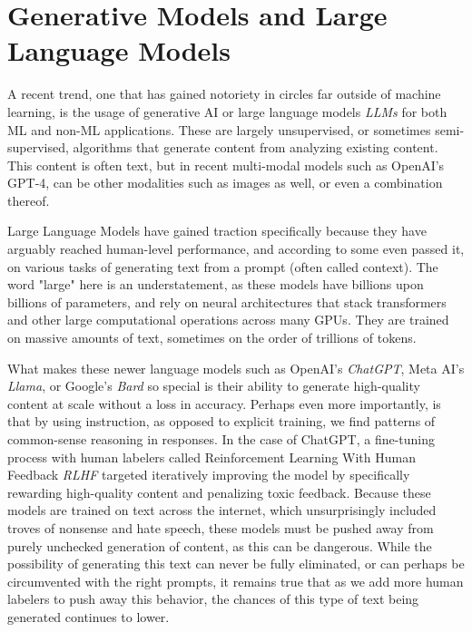 
\section{Generative Models and Large Language Models}

A recent trend, one that has gained notoriety in circles far outside of machine learning, is the usage of generative AI
or large language models \textit{LLMs} for both ML and non-ML applications. These are largely unsupervised, or sometimes
semi-supervised, algorithms that generate content from analyzing existing content. This content is often text, but in recent
multi-modal models such as OpenAI's GPT-4\cite{openai2023gpt4}, can be other modalities such as images as well, or even a combination thereof.

Large Language Models have gained traction specifically because they have arguably reached human-level performance, and according
to some even passed it, on various tasks of generating text from a prompt (often called context). The word "large" here is an understatement,
as these models have billions upon billions of parameters, and rely on neural architectures that stack transformers and other large
computational operations across many GPUs. They are trained on massive amounts of text, sometimes on the order of trillions\cite{touvron2023llama} of tokens.

What makes these newer language models such as OpenAI's \textit{ChatGPT}, Meta AI's \textit{Llama}\cite{touvron2023llama}, or Google's \textit{Bard} so special
is their ability to generate high-quality content at scale without a loss in accuracy. Perhaps even more importantly, is that by using instruction, as opposed to explicit training,
we find patterns of common-sense reasoning in responses. In the case of ChatGPT, a fine-tuning process with
human labelers called Reinforcement Learning With Human Feedback \textit{RLHF} targeted iteratively improving the model by specifically
rewarding high-quality content and penalizing toxic feedback. Because these models are trained on text across the internet, which
unsurprisingly included troves of nonsense and hate speech, these models must be pushed away from purely unchecked generation of content,
as this can be dangerous. While the possibility of generating this text can never be fully eliminated, or can perhaps be circumvented with the right prompts, it remains true
that as we add more human labelers to push away this behavior, the chances of this type of text being generated continues to lower.

